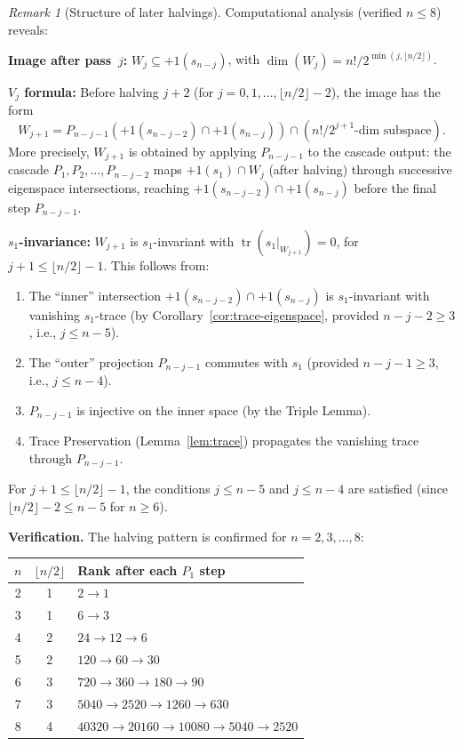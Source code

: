 \documentclass[11pt]{article}
\theoremstyle{definition}
\theoremstyle{remark}
\newtheorem{remark}[theorem]{Remark}
\newcommand{\tr}{\operatorname{tr}}
\begin{document}
\begin{remark}[Structure of later halvings]
Computational analysis (verified $n \le 8$) reveals:

\textbf{Image after pass~$j$:} $W_j \subseteq +1(s_{n-j})$,
with $\dim(W_j) = n!/2^{\min(j, \lfloor n/2 \rfloor)}$.

\textbf{$V_j$ formula:} Before halving $j{+}2$ (for
$j = 0, 1, \dots, \lfloor n/2 \rfloor - 2$), the image has the
form
\[
  W_{j+1} = P_{n-j-1}\!\left(
    +1(s_{n-j-2}) \cap +1(s_{n-j})
  \right) \cap (\text{$n!/2^{j+1}$-dim subspace}).
\]
More precisely, $W_{j+1}$ is obtained by applying $P_{n-j-1}$ to the
cascade output: the cascade $P_1, P_2, \dots, P_{n-j-2}$ maps
$+1(s_1) \cap W_j$ (after halving) through successive eigenspace
intersections, reaching $+1(s_{n-j-2}) \cap +1(s_{n-j})$ before the
final step $P_{n-j-1}$.

\textbf{$s_1$-invariance:} $W_{j+1}$ is $s_1$-invariant with
$\tr(s_1|_{W_{j+1}}) = 0$, for $j+1 \le \lfloor n/2 \rfloor - 1$.
This follows from:
\begin{enumerate}
  \item The ``inner'' intersection
    $+1(s_{n-j-2}) \cap +1(s_{n-j})$ is $s_1$-invariant with
    vanishing $s_1$-trace (by Corollary~\ref{cor:trace-eigenspace},
    provided $n - j - 2 \ge 3$, i.e., $j \le n - 5$).
  \item The ``outer'' projection $P_{n-j-1}$ commutes with $s_1$
    (provided $n - j - 1 \ge 3$, i.e., $j \le n - 4$).
  \item $P_{n-j-1}$ is injective on the inner space (by the
    Triple Lemma).
  \item Trace Preservation (Lemma~\ref{lem:trace}) propagates the
    vanishing trace through $P_{n-j-1}$.
\end{enumerate}
For $j+1 \le \lfloor n/2 \rfloor - 1$, the conditions
$j \le n - 5$ and $j \le n - 4$ are satisfied (since
$\lfloor n/2 \rfloor - 2 \le n - 5$ for $n \ge 6$).
\end{remark}

\noindent\textbf{Verification.} The halving pattern is confirmed for
$n = 2, 3, \dots, 8$:

\medskip
\begin{center}
\begin{tabular}{c|c|l}
$n$ & $\lfloor n/2 \rfloor$ & Rank after each $P_1$ step \\
\hline
2 & 1 & $2 \to 1$ \\
3 & 1 & $6 \to 3$ \\
4 & 2 & $24 \to 12 \to 6$ \\
5 & 2 & $120 \to 60 \to 30$ \\
6 & 3 & $720 \to 360 \to 180 \to 90$ \\
7 & 3 & $5040 \to 2520 \to 1260 \to 630$ \\
8 & 4 & $40320 \to 20160 \to 10080 \to 5040 \to 2520$
\end{tabular}
\end{center}
\end{document}
